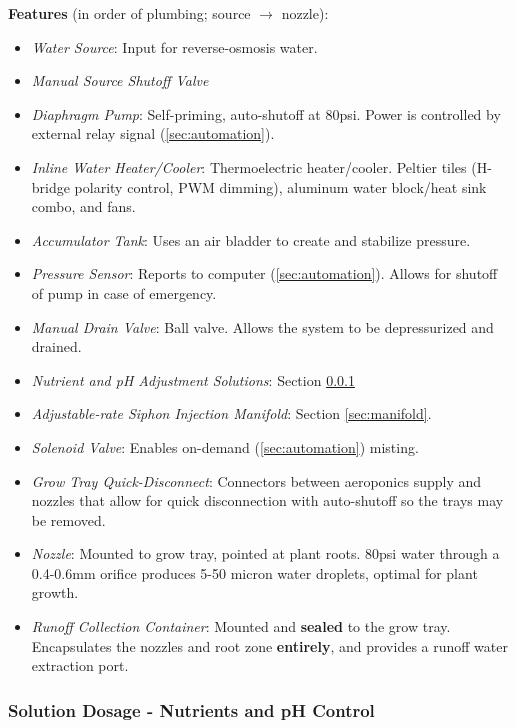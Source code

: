 \textbf{Features} (in order of plumbing; source $\to$ nozzle):
\begin{itemize}
    \item \textit{Water Source}: Input for reverse-osmosis water.
    \item \textit{Manual Source Shutoff Valve}
    \item \textit{Diaphragm Pump}: Self-priming, auto-shutoff at 80psi. Power is controlled by external relay signal (\ref{sec:automation}).
    \item \textit{Inline Water Heater/Cooler}: Thermoelectric heater/cooler. Peltier tiles (H-bridge polarity control, PWM dimming), aluminum water block/heat sink combo, and fans.
    \item \textit{Accumulator Tank}: Uses an air bladder to create and stabilize pressure.
    \item \textit{Pressure Sensor}: Reports to computer (\ref{sec:automation}). Allows for shutoff of pump in case of emergency.
    \item \textit{Manual Drain Valve}: Ball valve. Allows the system to be depressurized and drained.
    \item \textit{Nutrient and pH Adjustment Solutions}: Section \ref{sec:nutrientsph}
    \item \textit{Adjustable-rate Siphon Injection Manifold}: Section \ref{sec:manifold}.
    \item \textit{Solenoid Valve}: Enables on-demand (\ref{sec:automation}) misting.
    \item \textit{Grow Tray Quick-Disconnect}: Connectors between aeroponics supply and nozzles that allow for quick disconnection with auto-shutoff so the trays may be removed.
    \item \textit{Nozzle}: Mounted to grow tray, pointed at plant roots. 80psi water through a 0.4-0.6mm orifice produces 5-50 micron water droplets, optimal for plant growth. %
    \item \textit{Runoff Collection Container}: Mounted and \textbf{sealed} to the grow tray. Encapsulates the nozzles and root zone \textbf{entirely}, and provides a runoff water extraction port.
\end{itemize}

\newpage

\subsubsection{Solution Dosage - Nutrients and pH Control}
\label{sec:nutrientsph}


